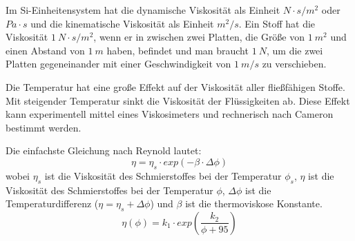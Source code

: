 Im Si-Einheitensystem hat die dynamische Viskosität als Einheit $N \cdot s/m^2$ oder $Pa \cdot s$ und die kinematische Viskosität als Einheit $m^2/s$.
Ein Stoff hat die Viskosität $1~N \cdot s/m^2$, wenn er in zwischen zwei Platten, die Größe von $1~m^2$ und einen Abstand von $1~m$ haben, befindet und man braucht $1~N$, um die zwei Platten gegeneinander mit einer Geschwindigkeit von $1~m/s$ zu verschieben.

Die Temperatur hat eine große Effekt auf der Viskosität aller fließfähigen Stoffe.
Mit steigender Temperatur sinkt die Viskosität der Flüssigkeiten ab.
Diese Effekt kann experimentell mittel eines Viskosimeters und rechnerisch nach Cameron bestimmt werden.

Die einfachste Gleichung nach Reynold lautet:
\begin{equation}
    \eta = \eta_{s} \cdot exp (-\beta \cdot \Delta\phi)
    \label{eq:dynamische_viskositaet_reynold}
\end{equation}
%
wobei $\eta_{s}$ ist die Viskosität des Schmierstoffes bei der Temperatur $\phi_{s}$, $\eta$ ist die Viskosität des Schmierstoffes bei der Temperatur $\phi$, $\Delta{\phi}$ ist die Temperaturdifferenz ($\eta = \eta_{s} + \Delta{\phi}$) und $\beta$ ist die thermoviskose Konstante.
\begin{equation}
    \eta(\phi) = k_1 \cdot exp \left( \frac{k_2}{\phi + 95} \right)
    \label{eq:dynamische_viskositaet_cameron}
\end{equation}

